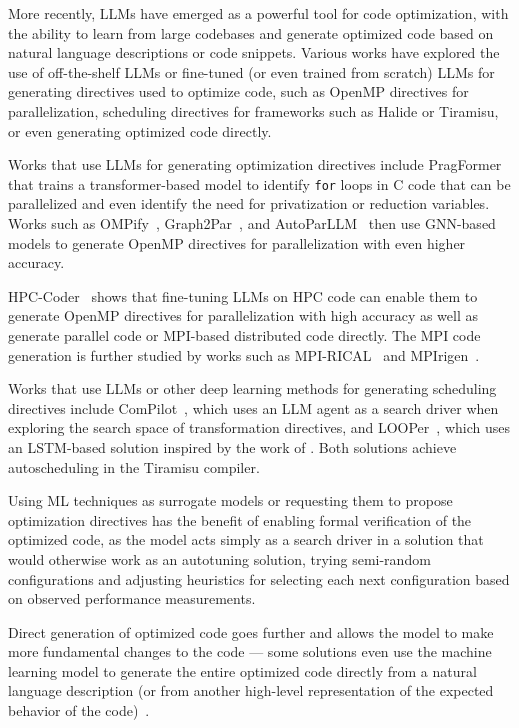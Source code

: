 More recently, LLMs have emerged as a powerful tool for code optimization, with the ability to learn from large codebases and generate optimized code based on natural language descriptions or code snippets. Various works have explored the use of off-the-shelf LLMs or fine-tuned (or even trained from scratch) LLMs for generating directives used to optimize code, such as OpenMP directives for parallelization, scheduling directives for frameworks such as Halide or Tiramisu, or even generating optimized code directly.

Works that use LLMs for generating optimization directives include PragFormer~\cite{harel2025pragformer} that trains a transformer-based model to identify \lstinline{for} loops in C code that can be parallelized and even identify the need for privatization or reduction variables. Works such as OMPify~\cite{kadosh2023advising}, Graph2Par~\cite{chen2023learning}, and AutoParLLM~\cite{mahmud2023autoparllm} then use GNN-based models to generate OpenMP directives for parallelization with even higher accuracy.

HPC-Coder~\cite{nichols2024hpc} shows that fine-tuning LLMs on HPC code can enable them to generate OpenMP directives for parallelization with high accuracy as well as generate parallel code or MPI-based distributed code directly. The MPI code generation is further studied by works such as MPI-RICAL~\cite{schneider2023mpi} and MPI{rigen}~\cite{schneider2024mpirigen}.

Works that use LLMs or other deep learning methods for generating scheduling directives include ComPilot~\cite{merouani2025agentic}, which uses an LLM agent as a search driver when exploring the search space of transformation directives, and LOOPer~\cite{merouani2025looper}, which uses an LSTM-based solution inspired by the work of \citeauthor{baghdadi2021deep}. Both solutions achieve autoscheduling in the Tiramisu compiler.

Using ML techniques as surrogate models or requesting them to propose optimization directives has the benefit of enabling formal verification of the optimized code, as the model acts simply as a search driver in a solution that would otherwise work as an autotuning solution, trying semi-random configurations and adjusting heuristics for selecting each next configuration based on observed performance measurements.

Direct generation of optimized code goes further and allows the model to make more fundamental changes to the code --- some solutions even use the machine learning model to generate the entire optimized code directly from a natural language description (or from another high-level representation of the expected behavior of the code)~\cite{godoy2024large}.

